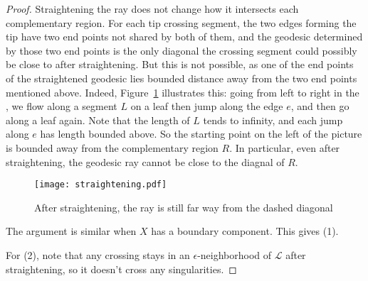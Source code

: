 \documentclass[11pt]{article} %
\theoremstyle{plain}
\theoremstyle{definition}
\numberwithin{equation}{section}
\begin{document}
\begin{proof}
Straightening the ray does not change how it intersects each complementary region. For each tip crossing segment, the two edges forming the tip have two end points not shared by both of them, and the geodesic determined by those two end points is the only diagonal the crossing segment could possibly be close to after straightening. But this is not possible, as one of the end points of the straightened geodesic lies bounded distance away from the two end points mentioned above. Indeed, Figure~\ref{fig:bounded_away} illustrates this: going from left to right in the , we flow along a segment $L$ on a leaf then jump along the edge $e$, and then go along a leaf again. Note that the length of $L$ tends to infinity, and each jump along $e$ has length bounded above. So the starting point on the left of the picture is bounded away from the complementary region $R$. In particular, even after straightening, the geodesic ray cannot be close to the diagnal of $R$.
\begin{figure}[ht!]
\centering
\texttt{[image: straightening.pdf]}
\iffalse
\begin{tikzpicture}[scale=0.7, thick]
\begin{scope}
\clip (-13.5,0)--(9,0)--(9,10)--(-13.5,10);
\draw[red] (2,0) circle (5);
\draw[fill=white] (12,0) circle (7);
\draw[red, fill=white] (-7,0) circle (6);
\begin{scope}
\clip (2,0) circle (5);
\draw (-7,0) circle (6);
\end{scope}
\begin{scope}
\clip (-14,0) circle (3);
\draw (-7,0) circle (6);
\end{scope}
\begin{scope}
\clip (-7,0) circle (6);
\draw[red] (-14,0) circle (3);
\draw [fill=white] (-9,0) circle (3);
\end{scope}
\begin{scope}
\clip (2,0) circle (5);
\draw [red] (12,0) circle (7);
\fill [white] (5,0) circle (0.5);
\end{scope}
\begin{scope}
\clip (5,0) circle (0.5);
\draw (12,0) circle (7);
\end{scope}
\end{scope}
\draw (-13.5,0)--(9,0);
\draw (0,0)--(0,10);
\draw (4,0)--(4,10);
\draw (0,0) arc (180:0:1);
\draw (2,0) arc (180:0:1);
\draw[dashed] (4,0) arc (0:180:2);

\node at (2,4.5) {\Large $e$};
\node at (-8,5.5) {\Large $L$};
\node at (1,9) {\Large $R$};
\end{tikzpicture}
\fi
\caption{After straightening, the ray is still far way from the dashed diagonal}
\label{fig:bounded_away}
\end{figure}
The argument is similar when $X$ has a boundary component. This gives (1).

For (2), note that any crossing stays in an $\epsilon$-neighborhood of $\mathcal{L}$ after straightening, so it doesn't cross any singularities.
\end{proof}
\end{document}
